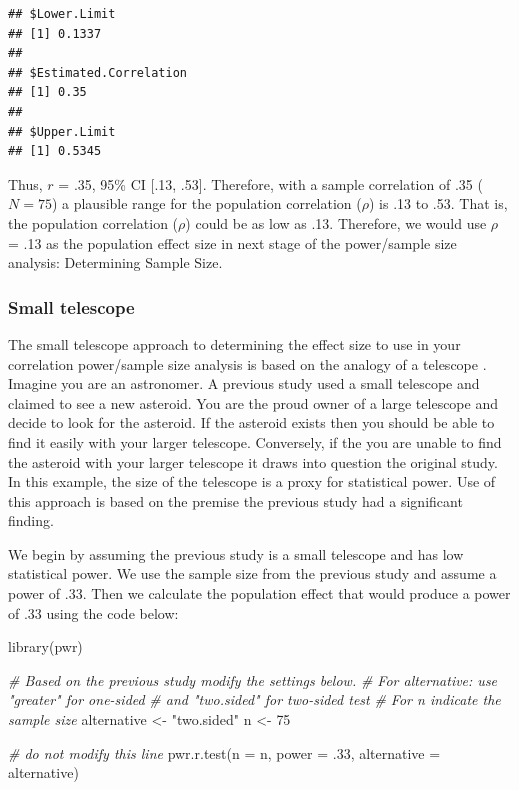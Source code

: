 \documentclass[
]{krantz}
\makeatletter
\newenvironment{Shaded}{\begin{snugshade}}{\end{snugshade}}
\newcommand{\AttributeTok}[1]{\textcolor[rgb]{0.61,0.61,0.61}{#1}}
\newcommand{\CommentTok}[1]{\textcolor[rgb]{0.37,0.37,0.37}{\textit{#1}}}
\newcommand{\DecValTok}[1]{\textcolor[rgb]{0.06,0.06,0.06}{#1}}
\newcommand{\FunctionTok}[1]{\textcolor[rgb]{0,0,0}{#1}}
\newcommand{\NormalTok}[1]{#1}
\newcommand{\OtherTok}[1]{\textcolor[rgb]{0.37,0.37,0.37}{#1}}
\newcommand{\StringTok}[1]{\textcolor[rgb]{0.5,0.5,0.5}{#1}}
\newenvironment{kframe}{%
\medskip{}
\setlength{\fboxsep}{.8em}
 \def\at@end@of@kframe{}%
 \ifinner\ifhmode%
  \def\at@end@of@kframe{\end{minipage}}%
  \begin{minipage}{\columnwidth}%
 \fi\fi%
 \def\FrameCommand##1{\hskip\@totalleftmargin \hskip-\fboxsep
 \colorbox{shadecolor}{##1}\hskip-\fboxsep
     \hskip-\linewidth \hskip-\@totalleftmargin \hskip\columnwidth}%
 \MakeFramed {\advance\hsize-\width
   \@totalleftmargin\z@ \linewidth\hsize
   \@setminipage}}%
 {\par\unskip\endMakeFramed%
 \at@end@of@kframe}
\renewenvironment{Shaded}{\begin{kframe}}{\end{kframe}}
\makeatother
\begin{document}
\begin{verbatim}
## $Lower.Limit
## [1] 0.1337
## 
## $Estimated.Correlation
## [1] 0.35
## 
## $Upper.Limit
## [1] 0.5345
\end{verbatim}

Thus, \(r\) = .35, 95\% CI {[}.13, .53{]}. Therefore, with a sample correlation of .35 (\(N=75\)) a plausible range for the population correlation (\(\rho\)) is .13 to .53. That is, the population correlation (\(\rho\)) could be as low as .13. Therefore, we would use \(\rho\) = .13 as the population effect size in next stage of the power/sample size analysis: Determining Sample Size.

\hypertarget{small-telescope-2}{%
\subsubsection{Small telescope}\label{small-telescope-2}}

The small telescope approach to determining the effect size to use in your correlation power/sample size analysis is based on the analogy of a telescope \citep{simonsohn2015small}. Imagine you are an astronomer. A previous study used a small telescope and claimed to see a new asteroid. You are the proud owner of a large telescope and decide to look for the asteroid. If the asteroid exists then you should be able to find it easily with your larger telescope. Conversely, if the you are unable to find the asteroid with your larger telescope it draws into question the original study. In this example, the size of the telescope is a proxy for statistical power. Use of this approach is based on the premise the previous study had a significant finding.

We begin by assuming the previous study is a small telescope and has low statistical power. We use the sample size from the previous study and assume a power of .33. Then we calculate the population effect that would produce a power of .33 using the code below:

\begin{Shaded}
\begin{Highlighting}[]
\FunctionTok{library}\NormalTok{(pwr)}

\CommentTok{\# Based on the previous study modify the settings below.}
\CommentTok{\# For alternative: use "greater" for one{-}sided }
\CommentTok{\# and "two.sided" for two{-}sided test}
\CommentTok{\# For n indicate the sample size}
\NormalTok{alternative }\OtherTok{\textless{}{-}} \StringTok{"two.sided"}
\NormalTok{n }\OtherTok{\textless{}{-}} \DecValTok{75}

\CommentTok{\# do not modify this line}
\FunctionTok{pwr.r.test}\NormalTok{(}\AttributeTok{n =}\NormalTok{ n,}
           \AttributeTok{power =}\NormalTok{ .}\DecValTok{33}\NormalTok{, }
           \AttributeTok{alternative =}\NormalTok{ alternative)}
\end{Highlighting}
\end{Shaded}
\end{document}
